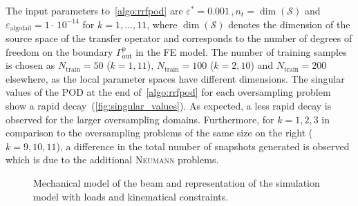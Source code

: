 \documentclass[a4paper]{eccomas_paper-2024}
\newcommand{\p}{\mathrm{p}}
\newcommand{\out}{\mathrm{out}}
\newcommand{\train}{\mathrm{train}}
\begin{document}
The input parameters to~\cref{algo:rrfpod} are $\varepsilon^{\ast}=0.001\,, n_t=\dim(\mathcal{S})$ and $\varepsilon_{\mathrm{algofail}}=1\cdot\,10^{-14}$ for $k=1, \ldots, 11$, where $\dim(\mathcal{S})$ denotes the dimension of the source space of the transfer operator and corresponds to the number of degrees of freedom on the boundary $\varGamma^{\p}_{\out}$ in the FE model.
The number of training samples is chosen as $N_{\train}=50$ ($k=1, 11$), $N_{\train}=100$ ($k=2, 10$) and $N_{\train}=200$ elsewhere, as the local parameter spaces have different dimensions.
The singular values of the POD at the end of~\cref{algo:rrfpod} for each oversampling problem show a rapid decay~(\cref{fig:singular_values}).
As expected, a less rapid decay is observed for the larger oversampling domains.
Furthermore, for $k=1, 2, 3$ in comparison to the oversampling problems of the same size on the right ($k=9, 10, 11$), a difference in the total number of snapshots generated is observed which is due to the additional \textsc{Neumann} problems.


\begin{figure}[h]
    \centering
    \hfill 
       \caption{Mechanical model of the beam and representation of the simulation model with loads and kinematical constraints.}
       \label{fig:beam_sketch}
\end{figure} 
\end{document}
